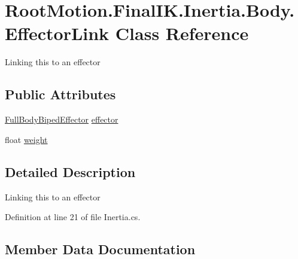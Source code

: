 \hypertarget{class_root_motion_1_1_final_i_k_1_1_inertia_1_1_body_1_1_effector_link}{}\section{Root\+Motion.\+Final\+I\+K.\+Inertia.\+Body.\+Effector\+Link Class Reference}
\label{class_root_motion_1_1_final_i_k_1_1_inertia_1_1_body_1_1_effector_link}


Linking this to an effector  


\subsection*{Public Attributes}
\begin{DoxyCompactItemize}
\item 
\mbox{\hyperlink{namespace_root_motion_1_1_final_i_k_ae0dd2058c7667b6f132c11a6b860c14a}{Full\+Body\+Biped\+Effector}} \mbox{\hyperlink{class_root_motion_1_1_final_i_k_1_1_inertia_1_1_body_1_1_effector_link_a9b1f04f0e5de987a89396190bba94d37}{effector}}
\item 
float \mbox{\hyperlink{class_root_motion_1_1_final_i_k_1_1_inertia_1_1_body_1_1_effector_link_ad7a750355925807a0643c3ca71888acb}{weight}}
\end{DoxyCompactItemize}


\subsection{Detailed Description}
Linking this to an effector 



Definition at line 21 of file Inertia.\+cs.



\subsection{Member Data Documentation}
\mbox{\label{class_root_motion_1_1_final_i_k_1_1_inertia_1_1_body_1_1_effector_link_a9b1f04f0e5de987a89396190bba94d37}} 
